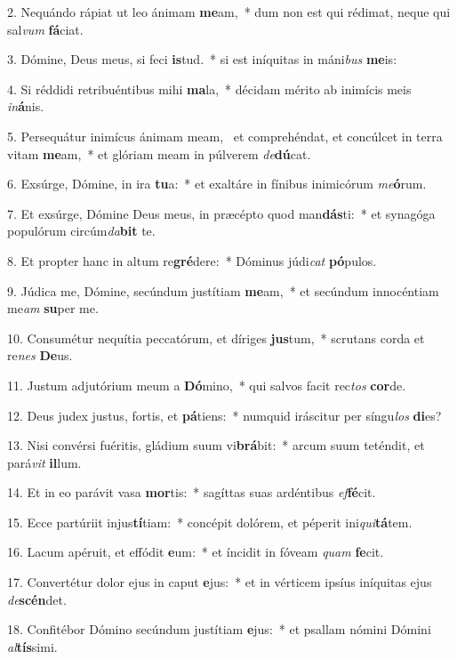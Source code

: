 2. Nequándo rápiat ut leo ánimam \textbf{me}am,~*  dum non est qui rédimat, neque qui sal\textit{vum} \textbf{fá}ciat.\

3. Dómine, Deus meus, si feci \textbf{is}tud.~*  si est iníquitas in máni\textit{bus} \textbf{me}is:\

4. Si réddidi retribuéntibus mihi \textbf{ma}la,~*  décidam mérito ab inimícis meis \textit{in}\textbf{á}nis.\

5. Persequátur inimícus ánimam meam, \dag\  et comprehéndat, et concúlcet in terra vitam \textbf{me}am,~*  et glóriam meam in púlverem \textit{de}\textbf{dú}cat.\

6. Exsúrge, Dómine, in ira \textbf{tu}a:~*  et exaltáre in fínibus inimicórum \textit{me}\textbf{ó}rum.\

7. Et exsúrge, Dómine Deus meus, in præcépto quod man\textbf{dás}ti:~*  et synagóga populórum circúm\textit{da}\textbf{bit} te.\

8. Et propter hanc in altum re\textbf{gré}dere:~*  Dóminus júdi\textit{cat} \textbf{pó}pulos.\

9. Júdica me, Dómine, secúndum justítiam \textbf{me}am,~*  et secúndum innocéntiam me\textit{am} \textbf{su}per me.\

10. Consumétur nequítia peccatórum, et díriges \textbf{jus}tum,~*  scrutans corda et re\textit{nes} \textbf{De}us.\

11. Justum adjutórium meum a \textbf{Dó}mino,~*  qui salvos facit rec\textit{tos} \textbf{cor}de.\

12. Deus judex justus, fortis, et \textbf{pá}tiens:~*  numquid iráscitur per síngu\textit{los} \textbf{di}es?\

13. Nisi convérsi fuéritis, gládium suum vi\textbf{brá}bit:~*  arcum suum teténdit, et pará\textit{vit} \textbf{il}lum.\

14. Et in eo parávit vasa \textbf{mor}tis:~*  sagíttas suas ardéntibus \textit{ef}\textbf{fé}cit.\

15. Ecce partúriit injus\textbf{tí}tiam:~*  concépit dolórem, et péperit ini\textit{qui}\textbf{tá}tem.\

16. Lacum apéruit, et effódit \textbf{e}um:~*  et íncidit in fóveam \textit{quam} \textbf{fe}cit.\

17. Convertétur dolor ejus in caput \textbf{e}jus:~*  et in vérticem ipsíus iníquitas ejus \textit{de}\textbf{scén}det.\

18. Confitébor Dómino secúndum justítiam \textbf{e}jus:~*  et psallam nómini Dómini \textit{al}\textbf{tís}simi.\

